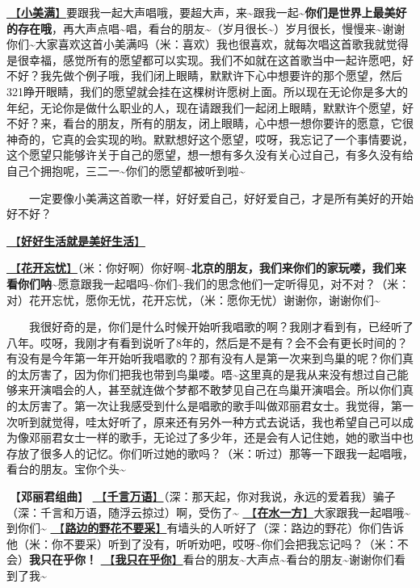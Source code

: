 \documentclass[]{ctexbook}
\begin{document}
\hyperref[happy-ending]{🎵【\textbf{小美满}】}要跟我一起大声唱哦，要超大声，来\textasciitilde 跟我一起\textasciitilde{}\textbf{你们是世界上最美好的存在哦}，再大声点唱\textasciitilde 唱，看台的朋友\textasciitilde（岁月很长\textasciitilde）岁月很长，慢慢来\textasciitilde 谢谢你们\textasciitilde 大家喜欢这首小美满吗（米：喜欢）我也很喜欢，就每次唱这首歌我就觉得是很幸福，感觉所有的愿望都可以实现。我们不如就在这首歌当中一起许愿吧，好不好？我先做个例子哦，我们闭上眼睛，默默许下心中想要许的那个愿望，然后321睁开眼睛，我们的愿望就会挂在这棵树许愿树上面。所以现在无论你是多大的年纪，无论你是做什么职业的人，现在请跟我们一起闭上眼睛，默默许个愿望，好不好？来，看台的朋友，所有的朋友，闭上眼睛，心中想一想你要许的愿意，它很神奇的，它真的会实现的哟。默默想好这个愿望，哎呀，我忘记了一个事情要说，这个愿望只能够许关于自己的愿望，想一想有多久没有关心过自己，有多久没有给自己个拥抱呢，三二一\textasciitilde 你们的愿望都被听到啦\textasciitilde{}

  一定要像小美满这首歌一样，好好爱自己，好好爱自己，才是所有美好的开始好不好？

\hyperref[live-happy-life-happy]{🎵【\textbf{好好生活就是美好生活}】}

\hyperref[no-worries]{🎵【\textbf{花开忘忧}】}（米：你好啊）你好啊\textasciitilde{}\textbf{北京的朋友，我们来你们的家玩喽，我们来看你们呐\textasciitilde{}}愿意跟我一起唱吗\textasciitilde 你们\textasciitilde 我们的思念他们一定听得见，对不对？（米：对）花开忘忧，愿你无忧，花开忘忧，（米：愿你无忧）谢谢你，谢谢你们\textasciitilde{}

  我很好奇的是，你们是什么时候开始听我唱歌的啊？我刚才看到有，已经听了八年。哎呀，我刚才有看到说听了8年的，然后是不是有？会不会有更长时间的？有没有是今年第一年开始听我唱歌的？那有没有人是第一次来到鸟巢的呢？你们真的太厉害了，因为你们把我也带到鸟巢喽。唔\textasciitilde 这里真的是我从来没有想过自己能够来开演唱会的人，甚至就连做个梦都不敢梦见自己在鸟巢开演唱会。所以你们真的太厉害了。第一次让我感受到什么是唱歌的歌手叫做邓丽君女士。我觉得，第一次听到就觉得，哇太好听了，原来还有另外一种方式去说话，我也希望自己可以成为像邓丽君女士一样的歌手，无论过了多少年，还是会有人记住她，她的歌当中也存放了很多人的记忆。你们听过她的歌吗？（米：听过）那等一下跟我一起唱哦，看台的朋友。宝你个头\textasciitilde{}

🎵【\textbf{邓丽君组曲}】
\hyperref[thousands-of-words]{🎵【\textbf{千言万语}】}（深：那天起，你对我说，永远的爱着我）骗子（深：千言和万语，随浮云掠过）啊，受伤了\textasciitilde{}
\hyperref[on-the-water-side]{🎵【\textbf{在水一方}】}大家跟我一起唱哦\textasciitilde 到你们\textasciitilde{}
\hyperref[walk-the-road-of-life]{🎵【\textbf{路边的野花不要采}】}有墙头的人听好了（深：路边的野花）你们告诉他（米：你不要采）听到了没有，听听劝吧，哎呀\textasciitilde 你们会把我忘记吗？（米：不会）\textbf{我只在乎你！}
\hyperref[only-you]{🎵【\textbf{我只在乎你}】}看台的朋友\textasciitilde 大声点\textasciitilde 看台的朋友\textasciitilde 谢谢你们看到了我\textasciitilde{}
\end{document}
